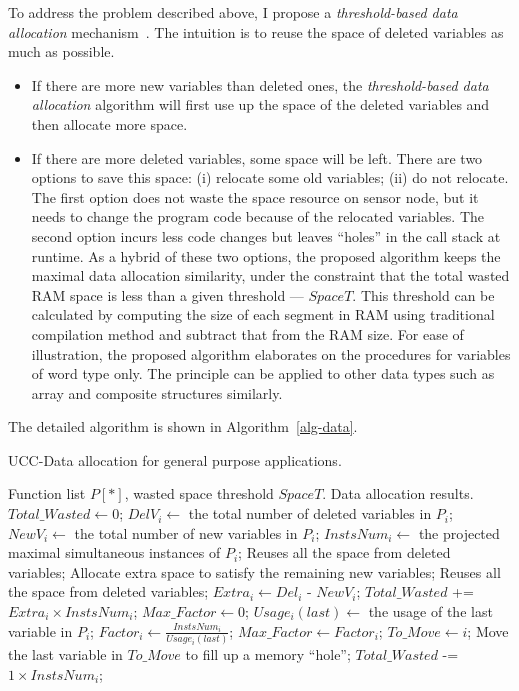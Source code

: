 To address the problem described above, I propose a {\em
threshold-based data allocation} mechanism~\cite{ucc}.  The intuition is to reuse
the space of deleted variables as much as possible. 
\begin{itemize}
	\item If there are more
new variables than deleted ones, the {\em
threshold-based data allocation} algorithm will first use up the space of the
deleted variables and then allocate more space. 
\item If there are more
deleted variables, some space will be left. 
There are two options to save this space: (i)
relocate some old variables; (ii) do not relocate. The first option
does not waste the space resource on sensor node, but it needs to
change the program code because of the relocated variables. The second
option incurs less code changes but leaves ``holes'' in the call stack 
at runtime. As a hybrid of these two options, the proposed
algorithm keeps the maximal data allocation similarity, under the constraint
that the total wasted RAM space is less than a given threshold --- $SpaceT$. 
This threshold can be calculated by computing the size of each segment 
in RAM using traditional compilation method and subtract that from the RAM 
size.
For ease of illustration, the proposed algorithm
elaborates on the procedures for variables of word type only. The principle can be
applied to other data types such as array and composite structures
similarly.
\end{itemize}

The detailed algorithm is shown in Algorithm~\ref{alg-data}.

\begin{algorithm}
\singlespace
\caption{UCC-Data allocation for general purpose applications.}
\label{alg-data}
\begin{algorithmic}[1]
\singlespace
\REQUIRE Function list $P[*]$, wasted space threshold $SpaceT$.
\ENSURE Data allocation results.
\STATE $Total\_Wasted \leftarrow 0$;
\STATE $DelV_i \leftarrow $ the total number of deleted variables in $P_i$;
\STATE $NewV_i \leftarrow $ the total number of new variables in $P_i$; 
\STATE $InstsNum_i \leftarrow $ the projected maximal simultaneous instances of $P_i$;
\STATE Reuses all the space from deleted variables;
\STATE Allocate extra space to satisfy the remaining new variables;
\ELSE
\STATE Reuses all the space from deleted variables;
\STATE $Extra_i \leftarrow Del_i$ - $NewV_i$;
\STATE $Total\_Wasted$ += $Extra_i \times InstsNum_i$;
\ENDIF
\ENDFOR
{}
\STATE $Max\_Factor \leftarrow 0$;
\STATE $Usage_i(last) \leftarrow$  the usage of the last variable in $P_i$;
\STATE $Factor_i \leftarrow \frac{InstsNum_i}{Usage_i(last)}$;
\STATE $Max\_Factor \leftarrow Factor_i$;
\STATE $To\_Move \leftarrow i$;
\ENDIF
\ENDFOR
\STATE Move the last variable in $To\_Move$ to fill up a memory ``hole'';
\STATE $Total\_Wasted$ -= $1\times InstsNum_i$;
\ENDWHILE
\end{algorithmic}
\end{algorithm}

